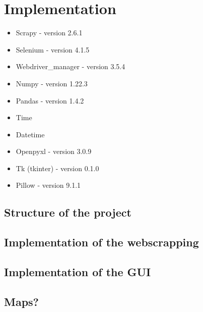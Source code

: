 \documentclass[main]{subfiles}
\begin{document}
\section{Implementation}
\begin{itemize}
    \item Scrapy -  version 2.6.1
    \item Selenium - version 4.1.5
    \item Webdriver\_manager - version 3.5.4
    \item Numpy -  version 1.22.3
    \item Pandas  - version 1.4.2
    \item Time
    \item Datetime
    \item Openpyxl - version 3.0.9
    \item Tk (tkinter) - version 0.1.0
    \item Pillow - version 9.1.1
\end{itemize}

\subsection{Structure of the project}

\subsection{Implementation of the webscrapping}

\subsection{Implementation of the GUI}


\subsection{Maps?}
\end{document}
